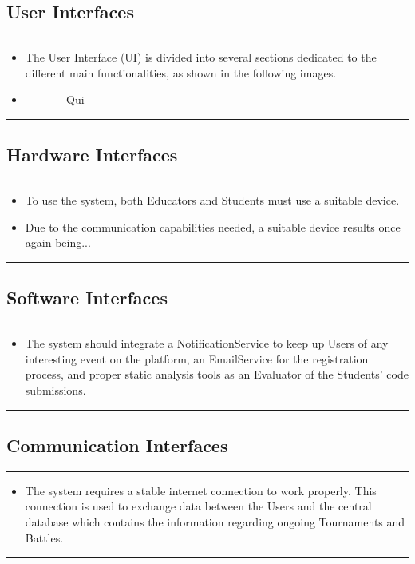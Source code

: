 \documentclass{Configuration_Files/Template}
\begin{document}
\subsection{User Interfaces}

{\color{bluepoli}\rule{\linewidth}{0.1pt}}
\begin{itemize}
\item The User Interface (UI) is divided into several sections dedicated to the different main functionalities, as shown in the following images.
\item ---------- Qui\\
\end{itemize}
{\color{bluepoli}\rule{\linewidth}{0.1pt}}

\subsection{Hardware Interfaces}

{\color{bluepoli}\rule{\linewidth}{0.1pt}}
\begin{itemize}
\item To use the system, both Educators and Students must use a suitable device.
\item Due to the communication capabilities needed, a suitable device results once again being...\\
\end{itemize}
{\color{bluepoli}\rule{\linewidth}{0.1pt}}

\subsection{Software Interfaces}

{\color{bluepoli}\rule{\linewidth}{0.1pt}}
\begin{itemize}
\item The system should integrate a NotificationService to keep up Users of any interesting event on the platform, an EmailService for the registration process, and proper static analysis tools as an Evaluator of the Students' code submissions.\\
\end{itemize}
{\color{bluepoli}\rule{\linewidth}{0.1pt}}

\subsection{Communication Interfaces}

{\color{bluepoli}\rule{\linewidth}{0.1pt}}
\begin{itemize}
\item The system requires a stable internet connection to work properly. This connection is used to exchange data between the Users and the central database which contains the information regarding ongoing Tournaments and Battles.\\
\end{itemize}
{\color{bluepoli}\rule{\linewidth}{0.1pt}}
\end{document}

